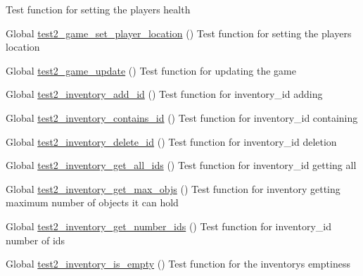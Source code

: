 \begin{DoxyRefList}
Test function for setting the player\textquotesingle{}s health  
\item[Global \mbox{\hyperlink{game__test_8c_ab3df4712338838d4037ac909629aa69d}{test2\+\_\+game\+\_\+set\+\_\+player\+\_\+location}} ()]\label{test__test000163}%
%
Test function for setting the player\textquotesingle{}s location  
\item[Global \mbox{\hyperlink{game__test_8c_aa7c7e1467a24f4d1086096b73a38739e}{test2\+\_\+game\+\_\+update}} ()]\label{test__test000144}%
%
Test function for updating the game  
\item[Global \mbox{\hyperlink{inventory__test_8c_abfb3407529398f76999549e42d567a7e}{test2\+\_\+inventory\+\_\+add\+\_\+id}} ()]\label{test__test000419}%
%
Test function for inventory\+\_\+id adding  
\item[Global \mbox{\hyperlink{inventory__test_8c_ac51748371cf572ede6f291ac714d2fef}{test2\+\_\+inventory\+\_\+contains\+\_\+id}} ()]\label{test__test000431}%
%
Test function for inventory\+\_\+id containing  
\item[Global \mbox{\hyperlink{inventory__test_8c_a23c8b0ed664f86b5fdafbfbd875ee27d}{test2\+\_\+inventory\+\_\+delete\+\_\+id}} ()]\label{test__test000424}%
%
Test function for inventory\+\_\+id deletion  
\item[Global \mbox{\hyperlink{inventory__test_8c_a8f8f6cbd2263bd79ba02506351df3407}{test2\+\_\+inventory\+\_\+get\+\_\+all\+\_\+ids}} ()]\label{test__test000435}%
%
Test function for inventory\+\_\+id getting all  
\item[Global \mbox{\hyperlink{inventory__test_8c_ab8a07623d86b3f0d414e4b648fcea9ca}{test2\+\_\+inventory\+\_\+get\+\_\+max\+\_\+objs}} ()]\label{test__test000442}%
%
Test function for inventory getting maximum number of objects it can hold  
\item[Global \mbox{\hyperlink{inventory__test_8c_a62bea3659c19fc0060df412385c4bd81}{test2\+\_\+inventory\+\_\+get\+\_\+number\+\_\+ids}} ()]\label{test__test000429}%
%
Test function for inventory\+\_\+id number of ids  
\item[Global \mbox{\hyperlink{inventory__test_8c_a4d2a2a4d4ba59446d013debfe9bf05dc}{test2\+\_\+inventory\+\_\+is\+\_\+empty}} ()]\label{test__test000416}%
%
Test function for the inventory\textquotesingle{}s emptiness  

\end{DoxyRefList}
